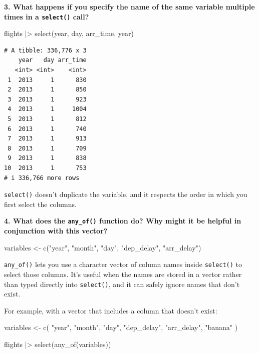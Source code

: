 \documentclass[
  letterpaper,
  DIV=11,
  numbers=noendperiod]{scrreprt}
\newenvironment{Shaded}{\begin{snugshade}}{\end{snugshade}}
\newcommand{\FunctionTok}[1]{\textcolor[rgb]{0.28,0.35,0.67}{#1}}
\newcommand{\NormalTok}[1]{\textcolor[rgb]{0.00,0.23,0.31}{#1}}
\newcommand{\OtherTok}[1]{\textcolor[rgb]{0.00,0.23,0.31}{#1}}
\newcommand{\SpecialCharTok}[1]{\textcolor[rgb]{0.37,0.37,0.37}{#1}}
\newcommand{\StringTok}[1]{\textcolor[rgb]{0.13,0.47,0.30}{#1}}
\begin{document}
\textbf{3. What happens if you specify the name of the same variable
multiple times in a \texttt{select()} call?}

\begin{Shaded}
\begin{Highlighting}[]
\NormalTok{flights }\SpecialCharTok{|\textgreater{}}
  \FunctionTok{select}\NormalTok{(year, day, arr\_time, year)}
\end{Highlighting}
\end{Shaded}

\begin{verbatim}
# A tibble: 336,776 x 3
    year   day arr_time
   <int> <int>    <int>
 1  2013     1      830
 2  2013     1      850
 3  2013     1      923
 4  2013     1     1004
 5  2013     1      812
 6  2013     1      740
 7  2013     1      913
 8  2013     1      709
 9  2013     1      838
10  2013     1      753
# i 336,766 more rows
\end{verbatim}

\texttt{select()} doesn't duplicate the variable, and it respects the
order in which you first select the columns.

\textbf{4. What does the \texttt{any\_of()} function do? Why might it be
helpful in conjunction with this vector?}

\begin{Shaded}
\begin{Highlighting}[]
\NormalTok{variables }\OtherTok{\textless{}{-}} \FunctionTok{c}\NormalTok{(}\StringTok{"year"}\NormalTok{, }\StringTok{"month"}\NormalTok{, }\StringTok{"day"}\NormalTok{, }\StringTok{"dep\_delay"}\NormalTok{, }\StringTok{"arr\_delay"}\NormalTok{)}
\end{Highlighting}
\end{Shaded}

\texttt{any\_of()} lets you use a character vector of column names
inside \texttt{select()} to select those columns. It's useful when the
names are stored in a vector rather than typed directly into
\texttt{select()}, and it can safely ignore names that don't exist.

For example, with a vector that includes a column that doesn't exist:

\begin{Shaded}
\begin{Highlighting}[]
\NormalTok{variables }\OtherTok{\textless{}{-}} \FunctionTok{c}\NormalTok{(}
  \StringTok{"year"}\NormalTok{,}
  \StringTok{"month"}\NormalTok{,}
  \StringTok{"day"}\NormalTok{,}
  \StringTok{"dep\_delay"}\NormalTok{,}
  \StringTok{"arr\_delay"}\NormalTok{,}
  \StringTok{"banana"}
\NormalTok{)}

\NormalTok{flights }\SpecialCharTok{|\textgreater{}}
  \FunctionTok{select}\NormalTok{(}\FunctionTok{any\_of}\NormalTok{(variables))}
\end{Highlighting}
\end{Shaded}
\end{document}

